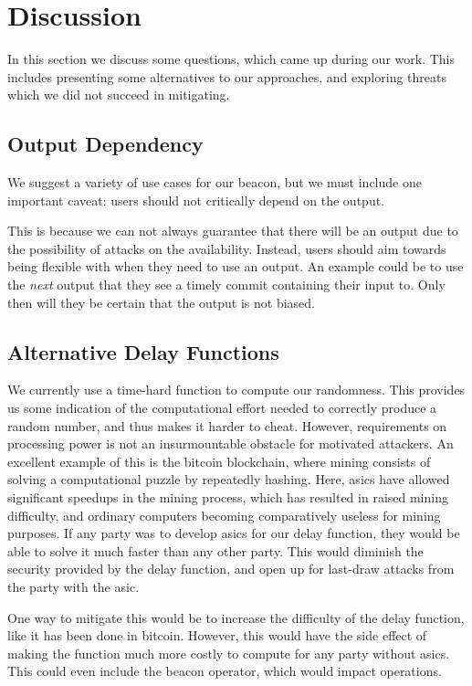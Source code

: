 \section{Discussion}%
\label{sec:discussion}
In this section we discuss some questions, which came up during our work.
This includes presenting some alternatives to our approaches, and exploring threats which we did not succeed in mitigating.

\subsection{Output Dependency}
We suggest a variety of use cases for our beacon, but we must include one important caveat: users should not critically depend on the output.

This is because we can not always guarantee that there will be an output due to the possibility of attacks on the availability.
Instead, users should aim towards being flexible with when they need to use an output.
An example could be to use the \textit{next} output that they see a timely commit containing their input to.
Only then will they be certain that the output is not biased.

\subsection{Alternative Delay Functions}
We currently use a time-hard function to compute our randomness.
This provides us some indication of the computational effort needed to correctly produce a random number, and thus makes it harder to cheat.
However, requirements on processing power is not an insurmountable obstacle for motivated attackers.
An excellent example of this is the bitcoin blockchain, where mining consists of solving a computational puzzle by repeatedly hashing.
Here, \glspl{asic} have allowed significant speedups in the mining process, which has resulted in raised mining difficulty, and ordinary computers becoming comparatively useless for mining purposes.
If any party was to develop \glspl{asic} for our delay function, they would be able to solve it much faster than any other party.
This would diminish the security provided by the delay function, and open up for last-draw attacks from the party with the \gls{asic}.

One way to mitigate this would be to increase the difficulty of the delay function, like it has been done in bitcoin.
However, this would have the side effect of making the function much more costly to compute for any party without \glspl{asic}.
This could even include the beacon operator, which would impact operations.


